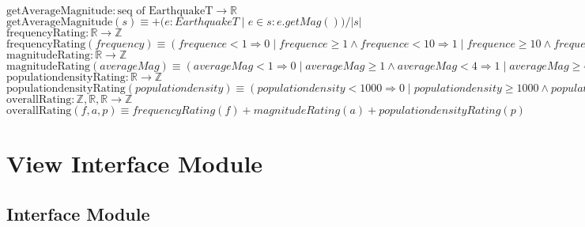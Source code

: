 \documentclass[12pt]{article}
\begin{document}
\noindent $\text{getAverageMagnitude}: \text{seq of EarthquakeT} \rightarrow \mathbb{R}$\\
\noindent $\text{getAverageMagnitude}(s) \equiv +(e: EarthquakeT \;|\; e \in s: e.getMag()) / |s| $\\


\noindent $\text{frequencyRating}: \mathbb{R} \rightarrow \mathbb{Z}$\\
\noindent $\text{frequencyRating}(frequency) \equiv (frequence < 1 \Rightarrow 0 \;|\; frequence \ge 1 \land frequence < 10 \Rightarrow 1 \;|\; frequence \ge 10 \land frequence < 100 \Rightarrow 2\;|\; frequence \ge 100 \land frequence < 1000 \Rightarrow 3\;|\; frequence \ge 1000  \Rightarrow 4) $\\


\noindent $\text{magnitudeRating}: \mathbb{R} \rightarrow \mathbb{Z}$\\
\noindent $\text{magnitudeRating}(averageMag) \equiv (averageMag < 1 \Rightarrow 0 \;|\; averageMag \ge 1 \land averageMag < 4 \Rightarrow 1 \;|\; averageMag \ge 4 \land averageMag < 6 \Rightarrow 2\;|\; averageMag \ge 6 \land averageMag < 7 \Rightarrow 3\;|\; averageMag \ge 7 \Rightarrow 4) $\\

\noindent $\text{populationdensityRating}: \mathbb{R} \rightarrow \mathbb{Z}$\\
\noindent $\text{populationdensityRating}(populationdensity) \equiv (populationdensity < 1000 \Rightarrow 0 \;|\; populationdensity \ge 1000 \land populationdensity < 5000 \Rightarrow 1 \;|\;populationdensity \ge 5000 \Rightarrow 2) $\\

\noindent $\text{overallRating}: \mathbb{Z}, \mathbb{R}, \mathbb{R} \rightarrow \mathbb{Z}$\\
\noindent $\text{overallRating}(f, a, p) \equiv frequencyRating(f) + magnitudeRating(a) + populationdensityRating(p)$\\






\newpage

\section* {View Interface Module}

\subsection* {Interface Module}
\end{document}
